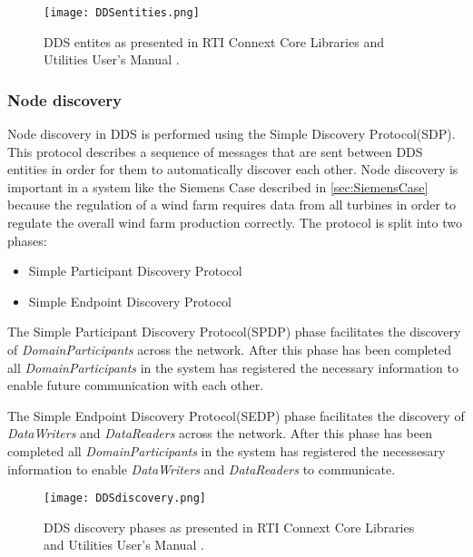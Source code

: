 \begin{figure}
	\centering
	\texttt{[image: DDSentities.png]} 
	\caption[DDS entities]{
		\label{fig:ddsEntities} 
		\footnotesize{%
			DDS entites as presented in RTI Connext Core Libraries and Utilities User's Manual \cite{rtiConnextUsersManual}.
		}
	}
\end{figure}

\subsubsection{Node discovery}
Node discovery in DDS is performed using the Simple Discovery Protocol(SDP).
This protocol describes a sequence of messages that are sent between DDS entities in order for them to automatically discover each other.
Node discovery is important in a system like the Siemens Case described in \cref{sec:SiemensCase} because the regulation of a wind farm requires data from all turbines in order to regulate the overall wind farm production correctly.
The protocol is split into two phases:

\begin{itemize}
	\item Simple Participant Discovery Protocol
	\item Simple Endpoint Discovery Protocol
\end{itemize}

The Simple Participant Discovery Protocol(SPDP) phase facilitates the discovery of \textit{DomainParticipants} across the network.
After this phase has been completed all \textit{DomainParticipants} in the system has registered the necessary information to enable future communication with each other.

The Simple Endpoint Discovery Protocol(SEDP) phase facilitates the discovery of \textit{DataWriters} and \textit{DataReaders} across the network.
After this phase has been completed all \textit{DomainParticipants} in the system has registered the necessesary information to enable \textit{DataWriters} and \textit{DataReaders} to communicate.

\begin{figure}
	\centering
	\texttt{[image: DDSdiscovery.png]} 
	\caption[DDS discovery phases]{
		\label{fig:DDSdiscovery} 
		\footnotesize{%
			DDS discovery phases as presented in RTI Connext Core Libraries and Utilities User's Manual \cite{rtiConnextUsersManual}.
		}
	}
\end{figure}

